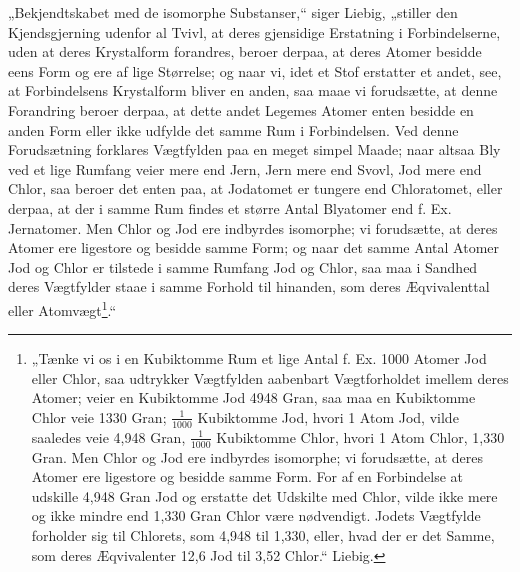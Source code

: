 \documentclass[12pt,a4paper]{book}
\begin{document}
„Bekjendtskabet med de isomorphe Substanser,“ siger
Liebig, „stiller den Kjendsgjerning udenfor al Tvivl, at deres
gjensidige Erstatning i Forbindelserne, uden at deres Krystalform
forandres, beroer derpaa, at deres Atomer besidde eens
Form og ere af lige Størrelse; og naar vi, idet et Stof
erstatter et andet, see, at Forbindelsens Krystalform bliver
en anden, saa maae vi forudsætte, at denne Forandring beroer
derpaa, at dette andet Legemes Atomer enten besidde en anden
Form eller ikke udfylde det samme Rum i Forbindelsen.
Ved denne Forudsætning forklares Vægtfylden paa en meget
simpel Maade; naar altsaa Bly ved et lige Rumfang veier
mere end Jern, Jern mere end Svovl, Jod mere end Chlor,
saa beroer det enten paa, at Jodatomet er tungere end Chloratomet,
eller derpaa, at der i samme Rum findes et større
Antal Blyatomer end f. Ex. Jernatomer. Men Chlor og
Jod ere indbyrdes isomorphe; vi forudsætte, at deres Atomer
ere ligestore og besidde samme Form; og naar det samme
Antal Atomer Jod og Chlor er tilstede i samme Rumfang
Jod og Chlor, saa maa i Sandhed deres Vægtfylder staae i
samme Forhold til hinanden, som deres Æqvivalenttal eller
Atomvægt\footnote{„Tænke vi os i en Kubiktomme Rum et lige Antal
f. Ex. 1000
Atomer Jod eller Chlor, saa udtrykker Vægtfylden aabenbart
Vægtforholdet imellem deres Atomer; veier en Kubiktomme Jod
4948 Gran, saa maa en Kubiktomme Chlor veie 1330 Gran;
$\frac{1}{1000}$ Kubiktomme Jod, hvori 1 Atom Jod, vilde saaledes veie
4,948 Gran, $\frac{1}{1000}$ Kubiktomme Chlor, hvori 1 Atom Chlor, 1,330
Gran. Men Chlor og Jod ere indbyrdes isomorphe; vi forudsætte,
at deres Atomer ere ligestore og besidde samme Form. For
af en Forbindelse at udskille 4,948 Gran Jod og erstatte det
Udskilte med Chlor, vilde ikke mere og ikke mindre end 1,330
Gran Chlor være nødvendigt. Jodets Vægtfylde forholder sig
til Chlorets, som 4,948 til 1,330, eller, hvad der er det Samme,
som deres Æqvivalenter 12,6 Jod til 3,52 Chlor.“ Liebig.}.“
\end{document}
